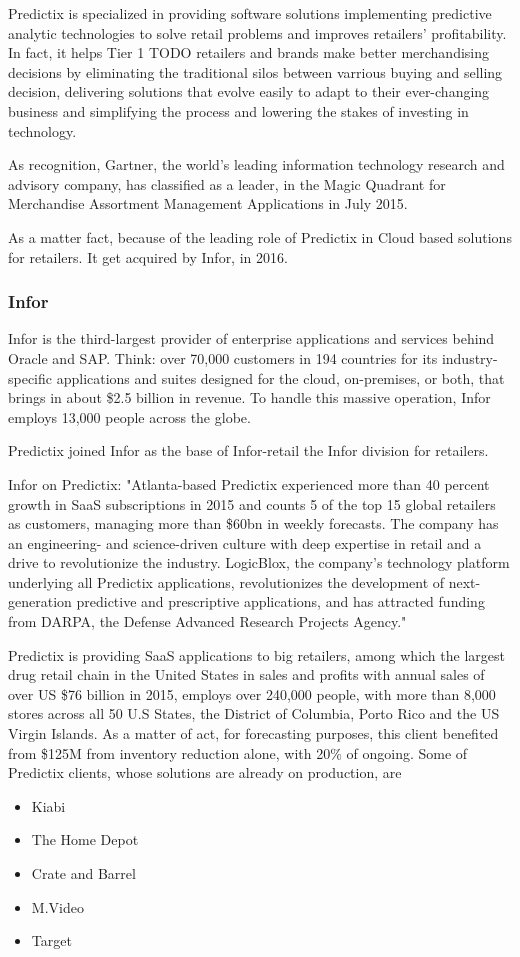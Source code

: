 Predictix is specialized in providing software solutions implementing predictive
analytic technologies to solve retail problems and improves retailers'
profitability. In fact, it helps Tier 1 TODO retailers and brands make better
merchandising decisions  by eliminating the traditional silos between varrious
buying and selling decision, delivering solutions that evolve easily to adapt to
their ever-changing business and simplifying the process and lowering the stakes
of investing in technology.

As recognition, Gartner, the world's leading information technology research and
advisory company, has classified as a leader, in the Magic Quadrant for
Merchandise Assortment Management Applications in July 2015.

As a matter fact, because of the leading role of Predictix in Cloud based
solutions for retailers. It get acquired by Infor, in 2016.

\subsubsection{Infor}
Infor is the third-largest provider of enterprise applications and services
behind Oracle and SAP. Think: over 70,000 customers in 194 countries for its
industry-specific applications and suites designed for the cloud, on-premises,
or both, that brings in about \$2.5 billion in revenue. To handle this massive
operation, Infor employs 13,000 people across the globe.

Predictix joined Infor as the base of Infor-retail the Infor division for
retailers.

Infor on Predictix:
"Atlanta-based Predictix experienced more than 40 percent growth in SaaS
subscriptions in 2015 and counts 5 of the top 15 global retailers as customers,
managing more than \$60bn in weekly forecasts. The company has an engineering-
and science-driven culture with deep expertise in retail and a drive to
revolutionize the industry. LogicBlox, the company's technology platform
underlying all Predictix applications, revolutionizes the development of
next-generation predictive and prescriptive applications, and has attracted
funding from DARPA, the Defense Advanced Research Projects Agency."

Predictix is providing SaaS applications to big retailers, among which the
largest drug retail chain in the United States in sales and profits with annual
sales of over US \$76 billion in 2015, employs over 240,000 people, with more
than 8,000 stores  across all 50 U.S States, the District of Columbia, Porto
Rico and the US Virgin Islands. As a matter of act, for forecasting purposes,
this client benefited from \$125M from inventory reduction alone, with 20\% of
ongoing. Some of Predictix clients, whose solutions are already on production,
are
\begin{itemize}
\item{Kiabi}
\item{The Home Depot}
\item{Crate and Barrel}
\item{M.Video}
\item{Target}
\end{itemize}

